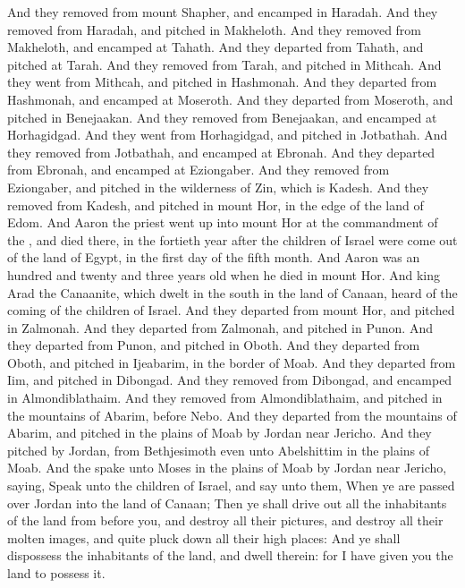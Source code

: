 \begin{biblechapter}
\verse And they removed from mount Shapher, and encamped in Haradah.
\verse And they removed from Haradah, and pitched in Makheloth.
\verse And they removed from Makheloth, and encamped at Tahath.
\verse And they departed from Tahath, and pitched at Tarah.
\verse And they removed from Tarah, and pitched in Mithcah.
\verse And they went from Mithcah, and pitched in Hashmonah.
\verse And they departed from Hashmonah, and encamped at Moseroth.
\verse And they departed from Moseroth, and pitched in Benejaakan.
\verse And they removed from Benejaakan, and encamped at Horhagidgad.
\verse And they went from Horhagidgad, and pitched in Jotbathah.
\verse And they removed from Jotbathah, and encamped at Ebronah.
\verse And they departed from Ebronah, and encamped at Eziongaber.
\verse And they removed from Eziongaber, and pitched in the wilderness of Zin, which is Kadesh.
\verse And they removed from Kadesh, and pitched in mount Hor, in the edge of the land of Edom.
\verse And Aaron the priest went up into mount Hor at the commandment of the \LORD, and died there, in the fortieth year after the children of Israel were come out of the land of Egypt, in the first day of the fifth month.
\verse And Aaron was an hundred and twenty and three years old when he died in mount Hor.
\verse And king Arad the Canaanite, which dwelt in the south in the land of Canaan, heard of the coming of the children of Israel.
\verse And they departed from mount Hor, and pitched in Zalmonah.
\verse And they departed from Zalmonah, and pitched in Punon.
\verse And they departed from Punon, and pitched in Oboth.
\verse And they departed from Oboth, and pitched in Ijeabarim, in the border of Moab.
\verse And they departed from Iim, and pitched in Dibongad.
\verse And they removed from Dibongad, and encamped in Almondiblathaim.
\verse And they removed from Almondiblathaim, and pitched in the mountains of Abarim, before Nebo.
\verse And they departed from the mountains of Abarim, and pitched in the plains of Moab by Jordan near Jericho.
\verse And they pitched by Jordan, from Bethjesimoth even unto Abelshittim in the plains of Moab.
\verse And the \LORD spake unto Moses in the plains of Moab by Jordan near Jericho, saying,
\verse Speak unto the children of Israel, and say unto them, When ye are passed over Jordan into the land of Canaan;
\verse Then ye shall drive out all the inhabitants of the land from before you, and destroy all their pictures, and destroy all their molten images, and quite pluck down all their high places:
\verse And ye shall dispossess the inhabitants of the land, and dwell therein: for I have given you the land to possess it.

\end{biblechapter}

